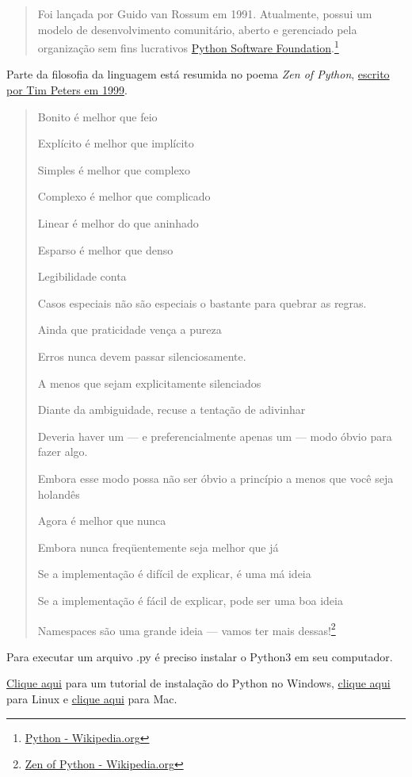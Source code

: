 \documentclass[
]{book}
\begin{document}
\begin{quote}
Foi lançada por Guido van Rossum em 1991. Atualmente, possui um modelo de desenvolvimento comunitário, aberto e gerenciado pela organização sem fins lucrativos \href{https://www.python.org/psf/}{Python Software Foundation}.\footnote{\href{https://pt.wikipedia.org/wiki/Python}{Python - Wikipedia.org}}
\end{quote}

Parte da filosofia da linguagem está resumida no poema \emph{Zen of Python}, \href{https://pt.wikipedia.org/wiki/Python}{escrito por Tim Peters em 1999}.

\begin{quote}
Bonito é melhor que feio

Explícito é melhor que implícito

Simples é melhor que complexo

Complexo é melhor que complicado

Linear é melhor do que aninhado

Esparso é melhor que denso

Legibilidade conta

Casos especiais não são especiais o bastante para quebrar as regras.

Ainda que praticidade vença a pureza

Erros nunca devem passar silenciosamente.

A menos que sejam explicitamente silenciados

Diante da ambiguidade, recuse a tentação de adivinhar

Deveria haver um --- e preferencialmente apenas um --- modo óbvio para fazer algo.

Embora esse modo possa não ser óbvio a princípio a menos que você seja holandês

Agora é melhor que nunca

Embora nunca freqüentemente seja melhor que já

Se a implementação é difícil de explicar, é uma má ideia

Se a implementação é fácil de explicar, pode ser uma boa ideia

Namespaces são uma grande ideia --- vamos ter mais dessas!\footnote{\href{https://pt.wikipedia.org/wiki/Zen_of_Python}{Zen of Python - Wikipedia.org}}
\end{quote}

Para executar um arquivo .py é preciso instalar o Python3 em seu computador.

\href{https://python.org.br/instalacao-windows/}{Clique aqui} para um tutorial de instalação do Python no Windows, \href{https://python.org.br/instalacao-linux/}{clique aqui} para Linux e \href{https://python.org.br/instalacao-mac/}{clique aqui}
para Mac.
\end{document}
